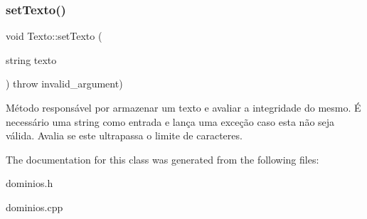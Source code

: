 \subsubsection{\texorpdfstring{set\+Texto()}{setTexto()}}
{\footnotesize\ttfamily void Texto\+::set\+Texto (\begin{DoxyParamCaption}\item[{string}]{texto }\end{DoxyParamCaption}) throw  invalid\+\_\+argument) }

Método responsável por armazenar um texto e avaliar a integridade do mesmo. É necessário uma string como entrada e lança uma exceção caso esta não seja válida. Avalia se este ultrapassa o limite de caracteres. 

The documentation for this class was generated from the following files\+:\begin{DoxyCompactItemize}
\item 
dominios.\+h\item 
dominios.\+cpp\end{DoxyCompactItemize}
